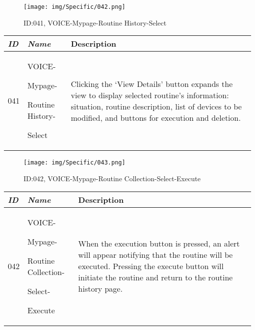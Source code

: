 \documentclass[conference]{IEEEtran}
\begin{document}
\begin{enumerate}[label=\arabic*]
    \vspace{2em}

    \begin{figure}[h]
        \centering
        \texttt{[image: img/Specific/042.png]}
        \caption{ID:041, VOICE-Mypage-Routine History-Select}
    \end{figure}

    \begin{table}[h]
    \def\arraystretch{1.2} \small
        \begin{tabular}{|p{1cm}|p{1.8cm}|p{4.8cm}|}
        \hline
            \textit{\textbf{ID}} & \textit{\textbf{Name}} & {\textbf{Description}} \\
        \hline
            041 \par & VOICE-\par Mypage-\par Routine History-\par Select & Clicking the ‘View Details’ button expands the view to display selected routine's information: situation, routine description, list of devices to be modified, and buttons for execution and deletion. \\
        \hline
        \end{tabular}
    \end{table}

    \clearpage

    \begin{figure}[h]
        \centering
        \texttt{[image: img/Specific/043.png]}
        \caption{ID:042, VOICE-Mypage-Routine Collection-Select-Execute}
    \end{figure}

    \begin{table}[h]
    \def\arraystretch{1.2} \small
        \begin{tabular}{|p{1cm}|p{1.8cm}|p{4.8cm}|}
        \hline
            \textit{\textbf{ID}} & \textit{\textbf{Name}} & {\textbf{Description}} \\
        \hline
            042 \par & VOICE-\par Mypage-\par Routine Collection-\par Select-\par Execute & When the execution button is pressed, an alert will appear notifying that the routine will be executed. Pressing the execute button will initiate the routine and return to the routine history page. \\
        \hline
        \end{tabular}
    \end{table}


\end{enumerate}
\end{document}
